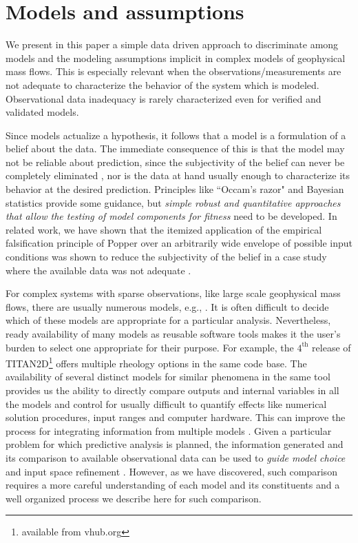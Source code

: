 
\section{Models and assumptions}
We present in this paper a simple data driven approach to discriminate among models and the modeling assumptions implicit in complex models of geophysical mass flows.
This is especially relevant when the observations/measurements are not adequate to characterize the behavior of the system which is modeled. Observational { data inadequacy} is rarely characterized even for verified and validated models.

Since models actualize a hypothesis, it follows  that a model is a formulation of a belief about the data. The immediate consequence of this is that the model may not be reliable about prediction, since the {subjectivity of the belief} can never be completely eliminated \citep{Kennedy2001, Higdon2004}, nor is  the data at hand  usually enough to characterize its behavior at the desired prediction. Principles like ``Occam's razor" and Bayesian statistics \citep{Farrell2015} provide some guidance, but {\it simple robust and quantitative approaches that allow the  testing of model components for fitness }need to be developed. In related work, we have shown that the itemized application of the empirical falsification principle of  Popper \citep{Popper1959} over an arbitrarily wide envelope of possible input conditions was shown to reduce the subjectivity of the belief in a case study where the available data was not adequate \citep{Bevilacqua2019}.%

For complex systems with sparse observations, like large scale geophysical mass flows, there  are usually numerous models, e.g., \cite{Kelfoun2011}. It is often difficult to decide which of these models are appropriate for a particular analysis. Nevertheless, ready availability of many models as reusable software tools makes it the user's burden to select one appropriate for their purpose.
For example, the $\mathrm{4^{\mathrm{th}}}$ release of TITAN2D\footnote{available from vhub.org} offers multiple rheology options in the same code base. The availability of several distinct models for similar phenomena in the same tool provides us the ability to directly compare outputs and internal variables in all the models and control for usually difficult to quantify effects like numerical solution procedures, input ranges and computer hardware. This can improve the process for integrating information from multiple models \citep{Bongard2007}. Given a particular problem for which predictive analysis is planned, the information generated and its comparison to available observational data can be used to {\it guide model choice }and input space refinement \citep{Patra2018b, Bevilacqua2019}.
However, as we have discovered, such comparison requires a more careful understanding of each model and its constituents and a well organized process we describe here for such comparison. %

